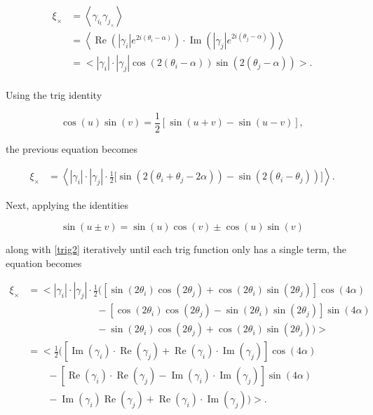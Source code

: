\documentclass[%
 reprint,
 amsmath,amssymb,
 aps,nofootinbib
]{revtex4-1}
\begin{document}
\begin{align*}
\xi_\times&=\left<\gamma_{i_t}\gamma_{j_\times}\right>\\
&=\left<\operatorname{Re}\left(|\gamma_i|e^{2i(\theta_i-\alpha)}\right)\cdot\operatorname{Im}\left(|\gamma_j|e^{2i(\theta_j-\alpha)}\right)\right>\\
&=\big<|\gamma_i|\cdot|\gamma_j|\cos\left(2(\theta_i-\alpha)\right)\sin\left(2(\theta_j-\alpha)\right)\big>.\\
\end{align*}

Using the trig identity

\begin{equation}\label{trig3}
\cos(u)\sin(v)=\frac{1}{2}\left[\sin(u+v)-\sin(u-v)\right],
\end{equation}

the previous equation becomes

\begin{align*}
\xi_\times&=\left<|\gamma_i|\cdot|\gamma_j|\cdot\frac{1}{2}\big[\sin\left(2(\theta_i+\theta_j-2\alpha)\right)-\sin\left(2(\theta_i-\theta_j)\right)\big]\right>.
\end{align*}

Next, applying the identities

\begin{equation}\label{trig4}
\sin(u\pm v)=\sin(u)\cos(v)\pm\cos(u)\sin(v)
\end{equation}

along with \eqref{trig2} iteratively until each trig function only has a single term, the equation becomes

\begin{align*}
\xi_\times&=\Big<|\gamma_i|\cdot|\gamma_j|\cdot\frac{1}{2}\Big(\left[\sin(2\theta_i)\cos(2\theta_j)+\cos(2\theta_i)\sin(2\theta_j)\right]\cos(4\alpha)\\
&\qquad\qquad\qquad\quad-\left[\cos(2\theta_i)\cos(2\theta_j)-\sin(2\theta_i)\sin(2\theta_j)\right]\sin(4\alpha)\\
&\qquad\qquad\qquad\quad-\sin(2\theta_i)\cos(2\theta_j)+\cos(2\theta_i)\sin(2\theta_j)\Big)\Big>\\
&=\Big<\frac{1}{2}\Big(\left[\operatorname{Im}(\gamma_i)\cdot\operatorname{Re}(\gamma_j)+\operatorname{Re}(\gamma_i)\cdot\operatorname{Im}(\gamma_j)\right]\cos(4\alpha)\\
&\qquad-\left[\operatorname{Re}(\gamma_i)\cdot\operatorname{Re}(\gamma_j)-\operatorname{Im}(\gamma_i)\cdot\operatorname{Im}(\gamma_j)\right]\sin(4\alpha)\\
&\qquad-\operatorname{Im}(\gamma_i)\operatorname{Re}(\gamma_j)+\operatorname{Re}(\gamma_i)\cdot\operatorname{Im}(\gamma_j)\Big)\Big>.\\
\end{align*}
\end{document}
